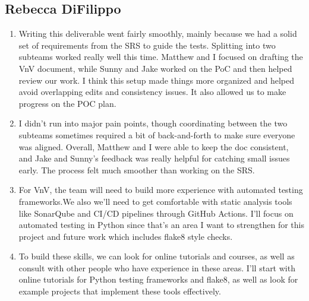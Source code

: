 \documentclass[12pt, titlepage]{article}
\begin{document}
\subsection*{Rebecca DiFilippo}
\begin{enumerate}
    \item Writing this deliverable went fairly smoothly, mainly because we had a solid set of
    requirements from the SRS to guide the tests. Splitting into two subteams worked really well
     this time. Matthew and I focused on drafting the VnV document, while Sunny and Jake worked
     on the PoC and then helped review our work. I think this setup made things more organized and
      helped avoid overlapping edits and consistency issues. It also allowed us to make progress
      on the POC plan.

    \item I didn’t run into major pain points, though coordinating between the two subteams
     sometimes required a bit of back-and-forth to make sure everyone was aligned. Overall, Matthew
      and I were able to keep the doc consistent, and Jake and Sunny’s feedback was really helpful
       for catching small issues early. The process felt much smoother than working on the SRS.

    \item For VnV, the team will need to build more experience with automated testing frameworks.We also we’ll need to
       get comfortable with static analysis tools like SonarQube and CI/CD pipelines through GitHub
        Actions. I’ll focus on automated testing in Python since that’s an area I want to strengthen
         for this project and future work which includes flake8 style checks.

    \item To build these skills, we can look for online  tutorials and courses, as well as consult
      with other people who have experience in these areas. I’ll start with online tutorials for
       Python testing frameworks and flake8, as well as look for example projects that implement
        these tools effectively.
\end{enumerate}
\end{document}
